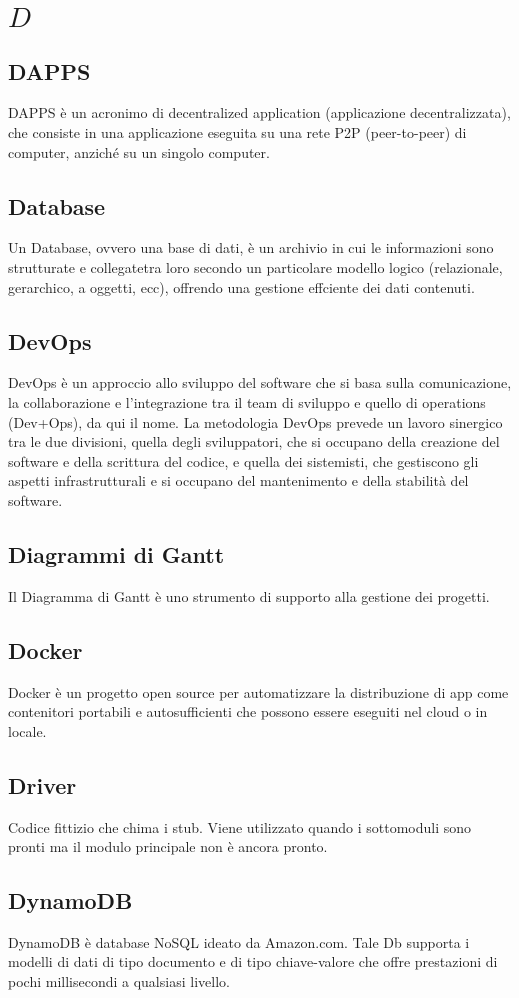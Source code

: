 \section{\quad$D\quad$}
\subsection{DAPPS}
DAPPS è un acronimo di decentralized application (applicazione decentralizzata), che consiste in una applicazione eseguita su una rete P2P (peer-to-peer) di computer, anziché su un singolo computer.

\subsection{Database}
Un Database, ovvero una base di dati, è un archivio in cui le informazioni sono strutturate e collegatetra loro secondo un particolare modello logico (relazionale, gerarchico, a oggetti, ecc), offrendo una gestione effciente dei dati contenuti. 

\subsection{DevOps}
DevOps è un approccio allo sviluppo del software che si basa sulla comunicazione, la collaborazione e l’integrazione tra il team di sviluppo e quello di operations (Dev+Ops), da qui il nome. La metodologia DevOps prevede un lavoro sinergico tra le due divisioni, quella degli sviluppatori, che si occupano della creazione del software e della scrittura del codice, e quella dei sistemisti, che gestiscono gli aspetti infrastrutturali e si occupano del mantenimento e della stabilità del software.

\subsection{Diagrammi di Gantt}
Il Diagramma di Gantt è uno strumento di supporto alla gestione dei progetti.


\subsection{Docker}
Docker è un progetto open source per automatizzare la distribuzione di app come contenitori portabili e autosufficienti che possono essere eseguiti nel cloud o in locale.

\subsection{Driver}
Codice fittizio che chima i stub. Viene utilizzato quando i sottomoduli sono pronti ma il modulo principale non è ancora pronto.

\subsection{DynamoDB}
DynamoDB è database NoSQL ideato da Amazon.com. Tale Db supporta i modelli di dati di tipo documento e di tipo chiave-valore che offre prestazioni di pochi millisecondi a qualsiasi livello.


